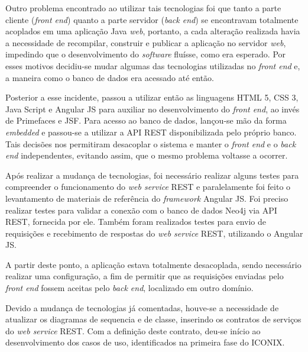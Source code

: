 \par Outro problema encontrado ao utilizar tais tecnologias foi que tanto a parte cliente (\textit{front end}) quanto a parte servidor (\textit{back end}) se encontravam totalmente acoplados em uma aplicação Java \textit{web}, portanto, a cada alteração realizada havia a necessidade de recompilar, construir e publicar a aplicação no servidor \textit{web}, impedindo que o desenvolvimento do \textit{software} fluísse, como era esperado. Por esses motivos decidiu-se mudar algumas das tecnologias utilizadas no \textit{front end} e, a maneira como o banco de dados era acessado até então. 

\par Posterior a esse incidente, passou a utilizar então as linguagens HTML 5, CSS 3, Java Script e Angular JS para auxiliar no desenvolvimento do \textit{front end}, ao invés de Primefaces e JSF. Para acesso ao banco de dados, lançou-se mão da forma \textit{embedded} e passou-se a utilizar a API REST disponibilizada pelo próprio banco. Tais decisões nos permitiram desacoplar o sistema e manter o \textit{front end} e o \textit{back end} independentes, evitando assim, que o mesmo problema voltasse a ocorrer. 

\par Após realizar a mudança de tecnologias, foi necessário realizar alguns testes para compreender o funcionamento do \textit{web service} REST e paralelamente foi feito o levantamento de materiais de referência do \textit{framework} Angular JS. Foi preciso realizar testes para validar a conexão com o banco de dados Neo4j via API REST, fornecida por ele. Também foram realizados testes para envio de requisições e recebimento de respostas do \textit{web service} REST, utilizando o Angular JS.

\par A partir deste ponto, a aplicação estava totalmente desacoplada, sendo necessário realizar uma configuração, a fim de permitir que as requisições enviadas pelo \textit{front end} fossem aceitas pelo \textit{back end}, localizado em outro domínio.

\par Devido a mudança de tecnologias já comentadas, houve-se a necessidade de atualizar os diagramas de sequencia e de classe, inserindo os contratos de serviços do \textit{web service} REST. Com a definição deste contrato, deu-se início ao desenvolvimento dos casos de uso, identificados na primeira fase do ICONIX. 

